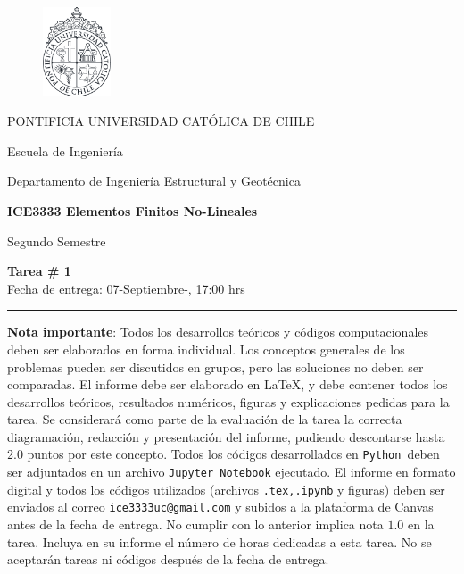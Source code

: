 \documentclass[11pt,letterpaper]{article}
\def\python{\mbox{\tt Python}}
\def\python{\mbox{\tt Python }}
\begin{document}
\begin{minipage}[t]{.14\textwidth}
	\vspace{-0.8cm}
	\begin{figure}[H]
	\centering
	\includegraphics[width=2cm]{LogoUC-BN.pdf}
	\end{figure}
\end{minipage}
\hfill
\begin{minipage}[t]{.85\textwidth}
\vspace{0.05cm}
	\begin{flushleft}
	PONTIFICIA UNIVERSIDAD CAT\'OLICA DE CHILE
	
	Escuela de Ingenier\'ia
	
	Departamento de Ingenier\'ia Estructural y Geot\'ecnica
	
	\textbf{ICE3333 Elementos Finitos No-Lineales}
	
	Segundo Semestre \the\year
	\end{flushleft}
\end{minipage}

\vspace{-10pt}
\begin{center}
\large
{\bf Tarea \# 1}\\
Fecha de entrega: 07-Septiembre-\the\year, 17:00 hrs
\rule{\linewidth}{0.4mm}

\end{center}

\vspace{-8pt}
\textbf{Nota importante}: Todos los desarrollos te\'oricos y c\'odigos computacionales deben ser elaborados en forma individual. Los conceptos generales de los problemas pueden ser discutidos en grupos, pero las soluciones no deben ser comparadas. El informe debe ser elaborado en \LaTeX, y debe contener todos los desarrollos te\'oricos, resultados num\'ericos, figuras y explicaciones pedidas para la tarea. Se considerar\'a como parte de la evaluaci\'on de la tarea la correcta diagramaci\'on, redacci\'on y presentaci\'on del informe, pudiendo descontarse hasta 2.0 puntos por este concepto. Todos los c\'odigos desarrollados en \python deben ser adjuntados en un archivo {\tt Jupyter Notebook} ejecutado. El informe en formato digital y todos los c\'odigos utilizados (archivos {\tt .tex,.ipynb} y figuras) deben ser enviados al correo {\tt ice3333uc@gmail.com} y subidos a la plataforma de
Canvas antes de la fecha de entrega. No cumplir con lo anterior implica nota $1.0$ en la tarea. Incluya en su informe el n\'umero de horas dedicadas a esta tarea. No se aceptar\'an tareas ni c\'odigos despu\'es de la fecha de entrega.
\end{document}
